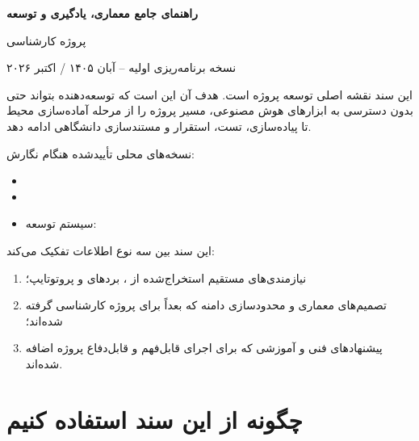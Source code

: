 \documentclass[12pt,twoside]{book}
\begin{document}
\frontmatter
\begin{titlepage}
\centering
\vspace*{3cm}
{\Huge\bfseries {}\par}
\vspace{0.7cm}
{\Large\bfseries راهنمای جامع معماری، یادگیری و توسعه\par}
\vspace{0.4cm}
{\large {}\par}
\vfill
{\large پروژه کارشناسی\par}
\vspace{0.5cm}
{\large نسخه برنامه‌ریزی اولیه -- آبان ۱۴۰۵ / اکتبر ۲۰۲۶\par}
\vspace*{2cm}
\end{titlepage}

\begin{tcolorbox}[colback=Parchment,colframe=InkSoft,title={وضعیت سند},fonttitle=\bfseries]
این سند نقشه اصلی توسعه پروژه  است. هدف آن این است که توسعه‌دهنده بتواند حتی بدون دسترسی به ابزارهای هوش مصنوعی، مسیر پروژه را از مرحله آماده‌سازی محیط تا پیاده‌سازی، تست، استقرار و مستندسازی دانشگاهی ادامه دهد.

نسخه‌های محلی تأییدشده هنگام نگارش:
\begin{itemize}
  \item {}
  \item {}
  \item سیستم توسعه: 
\end{itemize}

این سند بین سه نوع اطلاعات تفکیک می‌کند:
\begin{enumerate}
  \item نیازمندی‌های مستقیم استخراج‌شده از ، بردهای  و پروتوتایپ؛
  \item تصمیم‌های معماری و محدودسازی دامنه که بعداً برای پروژه کارشناسی گرفته شده‌اند؛
  \item پیشنهادهای فنی و آموزشی که برای اجرای قابل‌فهم و قابل‌دفاع پروژه اضافه شده‌اند.
\end{enumerate}
\end{tcolorbox}

\tableofcontents
\clearpage

\chapter*{چگونه از این سند استفاده کنیم}
\end{document}
